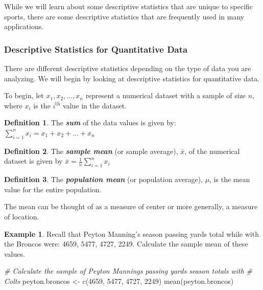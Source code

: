 \documentclass[
  11pt,
]{book}
\newenvironment{Shaded}{\begin{snugshade}}{\end{snugshade}}
\newcommand{\CommentTok}[1]{\textcolor[rgb]{0.56,0.35,0.01}{\textit{#1}}}
\newcommand{\DecValTok}[1]{\textcolor[rgb]{0.00,0.00,0.81}{#1}}
\newcommand{\FunctionTok}[1]{\textcolor[rgb]{0.00,0.00,0.00}{#1}}
\newcommand{\NormalTok}[1]{#1}
\newcommand{\OtherTok}[1]{\textcolor[rgb]{0.56,0.35,0.01}{#1}}
\theoremstyle{definition}
\newtheorem{definition}{Definition}[chapter]
\theoremstyle{definition}
\newtheorem{example}{Example}[chapter]
\theoremstyle{definition}
\theoremstyle{definition}
\theoremstyle{remark}
\begin{document}
While we will learn about some descriptive statistics that are unique to specific sports, there are some descriptive statistics that are frequently used in many applications.

\hypertarget{descriptive-statistics-for-quantitative-data}{%
\subsubsection{Descriptive Statistics for Quantitative Data}\label{descriptive-statistics-for-quantitative-data}}

There are different descriptive statistics depending on the type of data you are analyzing. We will begin by looking at descriptive statistics for quantitative data.

To begin, let \(x_1, x_2, \ldots, x_n\) represent a numerical dataset with a sample of size \(n\), where \(x_i\) is the \(i^\text{th}\) value in the dataset.

\begin{definition}
The \textbf{\emph{sum}} of the data values is given by: \(\sum_{i=1}^n x_i = x_1 + x_2 + \ldots + x_n\)
\end{definition}

\begin{definition}
The \textbf{\emph{sample mean}} (or sample average), \(\bar{x}\), of the numerical dataset is given by \(\bar{x} = \frac{1}{n} \sum_{i=1}^n x_i\)
\end{definition}

\begin{definition}
The \textbf{\emph{population mean}} (or population average), \(\mu\), is the mean value for the entire population.
\end{definition}

The mean can be thought of as a measure of center or more generally, a measure of location.

\begin{example}
Recall that Peyton Manning's season passing yards total while with the Broncos were: 4659, 5477, 4727, 2249. Calculate the sample mean of these values.
\end{example}

\hfill\break
\hfill\break
\hfill\break
\hfill\break
\hfill\break

\begin{Shaded}
\begin{Highlighting}[]
\CommentTok{\# Calculate the sample of Peyton Manning\textquotesingle{}s passing yards season totals with}
\CommentTok{\# Colts}
\NormalTok{peyton.broncos }\OtherTok{\textless{}{-}} \FunctionTok{c}\NormalTok{(}\DecValTok{4659}\NormalTok{, }\DecValTok{5477}\NormalTok{, }\DecValTok{4727}\NormalTok{, }\DecValTok{2249}\NormalTok{)}
\FunctionTok{mean}\NormalTok{(peyton.broncos)}
\end{Highlighting}
\end{Shaded}
\end{document}
